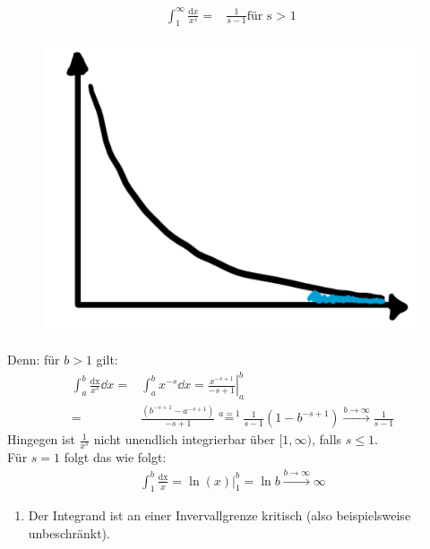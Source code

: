 \begin{Beispiel}{
	\begin{align*}
		\int_1^{\infty} \frac{\mathrm{d}x}{x^s} = & \frac{1}{s-1} \text{für s > 1 }
	\end{align*}
	\begin{figure}
		\centering
		\includegraphics[scale=0.3]{Skizzen/plot_bsp_uneigentlichesIntegral}
	\end{figure}
	Denn: für $b > 1$ gilt:
	\begin{align*}
		\int_a^b \frac{\mathrm{dx}}{x^s} \dd{x} = & \int_a^b x^{-s} \dd{x}
		  = \left.\frac{x^{-s+1}}{-s+1} \right\vert_a^b \\
		   = & \frac{\left( b^{-s+1} - a^{-s+1}\right)}{-s+1} \overset{a = 1}{=}
		  \frac{1}{s-1}\left(1-b^{-s+1}\right) 
		  \overset{b \rightarrow \infty}{\longrightarrow}
		  \frac{1}{s-1}
	\end{align*}
	Hingegen ist $\frac{1}{x^s}$ nicht unendlich integrierbar über $[1, \infty)$,
	falls $s \leq 1$.\\
	Für $s=1$ folgt das wie folgt:
	\begin{align*}
		\int_1^b \frac{\mathrm{dx}}{x} = \left. \ln(x) \right\vert_1^b 
		= \ln b \overset{b \rightarrow \infty}{\longrightarrow} \infty
	\end{align*}
}\end{Beispiel}

\begin{enumerate}[resume]
	\item Der Integrand ist an einer Invervallgrenze kritisch (also beispielsweise 
	unbeschränkt).
\end{enumerate}

